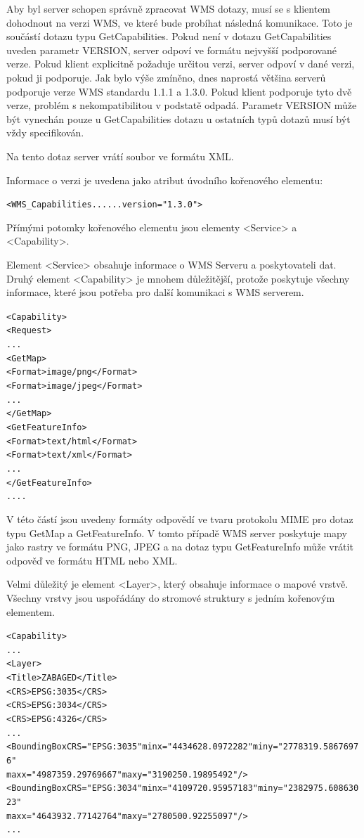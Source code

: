 \documentclass[a4paper,12pt]{article}
\begin{document}
Aby byl server schopen správně zpracovat WMS dotazy, musí se s klientem dohodnout na verzi WMS, ve které bude probíhat následná komunikace.
Toto je součástí dotazu typu GetCapabilities. Pokud není v dotazu GetCapabilities uveden parametr VERSION, server odpoví ve formátu nejvyšší podporované verze. 
Pokud klient explicitně požaduje určitou verzi, server odpoví v dané verzi, pokud ji podporuje. Jak bylo výše zmíněno, dnes naprostá většina serverů podporuje 
verze WMS standardu 1.1.1 a 1.3.0. Pokud klient podporuje tyto dvě verze, problém s nekompatibilitou v podstatě odpadá. Parametr VERSION může být vynechán pouze u GetCapabilities dotazu u ostatních typů dotazů musí být vždy specifikován.

Na tento dotaz server vrátí soubor ve formátu XML. 

Informace o verzi je uvedena jako atribut úvodního kořenového elementu:
\begin{alltt}\footnotesize
<WMS_Capabilities...    ...version="1.3.0">
\end{alltt}

Přímými potomky kořenového elementu jsou elementy <Service> a <Capability>.

Element  <Service> obsahuje informace o WMS Serveru a poskytovateli dat.
Druhý element <Capability> je mnohem důležitější, protože poskytuje všechny informace, které jsou potřeba pro další komunikaci s WMS serverem.

\begin{alltt}\footnotesize
<Capability>
    <Request>
          ...
       <GetMap>
            <Format>image/png</Format>
            <Format>image/jpeg</Format>
          ...
       </GetMap>	
       <GetFeatureInfo>
            <Format>text/html</Format>
            <Format>text/xml</Format>
              ...
       </GetFeatureInfo>
           ....
\end{alltt}
V této částí jsou uvedeny formáty odpovědí ve tvaru protokolu MIME pro dotaz typu GetMap a GetFeatureInfo. V tomto případě WMS server poskytuje  mapy jako rastry ve formátu PNG, JPEG a na 
dotaz typu GetFeatureInfo může vrátit odpověď ve formátu HTML nebo XML.  

Velmi důležitý je element <Layer>, který obsahuje informace o mapové vrstvě. Všechny vrstvy jsou uspořádány do stromové struktury s jedním kořenovým elementem.

\begin{alltt}\footnotesize
<Capability>
    ...
  <Layer>
   <Title>ZABAGED</Title>
     <CRS>EPSG:3035</CRS>
     <CRS>EPSG:3034</CRS>
     <CRS>EPSG:4326</CRS>
      ...
     <BoundingBox CRS="EPSG:3035" minx="4434628.0972282" miny="2778319.58676976"
                                  maxx="4987359.29769667" maxy="3190250.19895492"/>
     <BoundingBox CRS="EPSG:3034" minx="4109720.95957183" miny="2382975.60863023"
                                  maxx="4643932.77142764" maxy="2780500.92255097"/>
      ...
\end{alltt}
\end{document}
